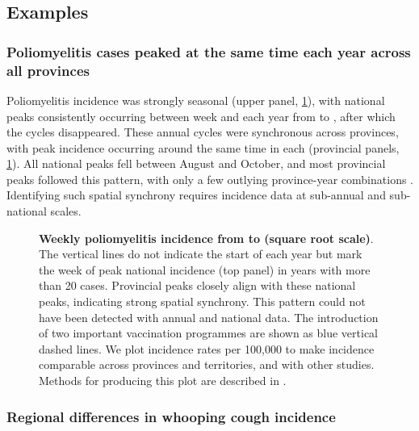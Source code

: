 \documentclass[12pt]{article}
\begin{document}
\subsection{Examples}\label{sec:illustrative-results}

\subsubsection{Poliomyelitis cases peaked at the same time each year across all provinces}\label{sec:polio-results}

Poliomyelitis incidence was strongly seasonal (upper panel, \cref{fig:polio-plot}), with national peaks consistently occurring between week  and  each year from  to , after which the cycles disappeared. These annual cycles were synchronous across provinces, with peak incidence occurring around the same time in each (provincial panels, \cref{fig:polio-plot}). All national peaks fell between August and October, and most provincial peaks followed this pattern, with only a few outlying province-year combinations . Identifying such spatial synchrony requires incidence data at sub-annual and sub-national scales.

\begin{figure}[!htb]
  \caption{\textbf{Weekly poliomyelitis incidence from \protect to \protect (square root scale)}. The vertical lines do not indicate the start of each year but mark the week of peak national incidence (top panel) in years with more than 20 cases. Provincial peaks closely align with these national peaks, indicating strong spatial synchrony. This pattern could not have been detected with annual and national data. The introduction of two important vaccination programmes are shown as blue vertical dashed lines. We plot incidence rates per 100,000 to make incidence comparable across provinces and territories, and with other studies. Methods for producing this plot are described in .}\label{fig:polio-plot}
\end{figure}

\subsubsection{Regional differences in whooping cough incidence}\label{sec:whooping-cough-results}
\end{document}
